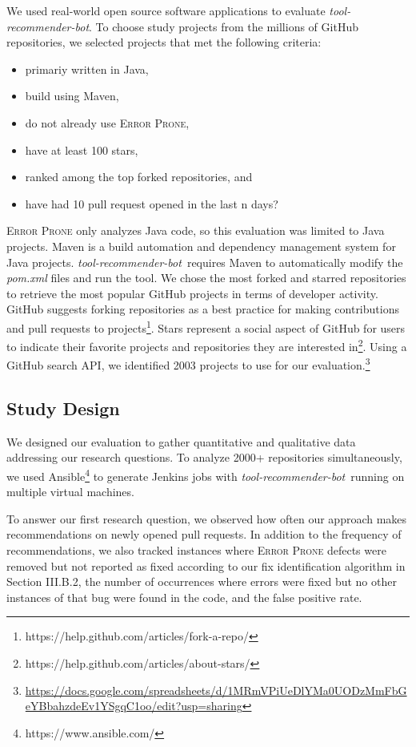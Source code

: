 \documentclass[conference]{IEEEtran}
\newcommand{\tool}{\textsl{tool-recommender-bot}}
\newcommand{\pseudosubsection}[1]{\vspace{2mm} \noindent{\it #1}}
\begin{document}
We used real-world open source software applications to evaluate \tool. To choose study projects from the millions of GitHub repositories, we selected projects that met the following criteria:

\begin{itemize}
\item primariy written in Java,
\item build using Maven,
\item do not already use \textsc{Error Prone},
\item have at least 100 stars,
\item ranked among the top forked repositories, and
\item have had 10 pull request opened in the last n days? %
\end{itemize}

\textsc{Error Prone} only analyzes Java code, so this evaluation was limited to Java projects. Maven is a build automation and dependency management system for Java projects. \tool~requires Maven to automatically modify the \textit{pom.xml} files and run the tool. We chose the most forked and starred repositories to retrieve the most popular GitHub projects in terms of developer activity. GitHub suggests forking repositories as a best practice for making contributions and pull requests to projects\footnote{https://help.github.com/articles/fork-a-repo/}. Stars represent a social aspect of GitHub for users to indicate their favorite projects and repositories they are interested in\footnote{https://help.github.com/articles/about-stars/}. Using a GitHub search API, we identified 2003 projects to use for our evaluation.\footnote{\url{https://docs.google.com/spreadsheets/d/1MRmVPiUeDlYMa0UODzMmFbGeYBbahzdeEv1YSgqC1oo/edit?usp=sharing}}

\subsection{Study Design}

We designed our evaluation to gather quantitative and qualitative data addressing our research questions.  To analyze 2000+ repositories simultaneously, we used Ansible\footnote{https://www.ansible.com/} to generate Jenkins jobs with \tool~running on multiple virtual machines.

\pseudosubsection{RQ1}

To answer our first research question, we observed how often our approach makes recommendations on newly opened pull requests. In addition to the frequency of recommendations, we also tracked instances where \textsc{Error Prone} defects were removed but not reported as fixed according to our fix identification algorithm in Section III.B.2, the number of occurrences where errors were fixed but no other instances of that bug were found in the code, and the false positive rate.
\end{document}
